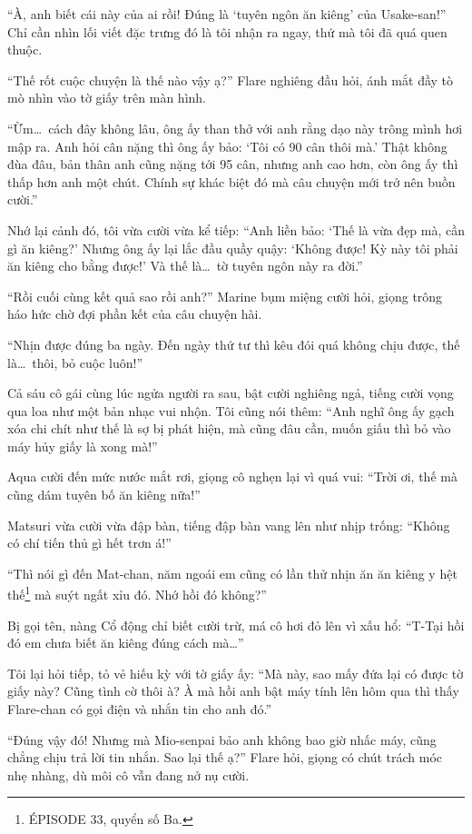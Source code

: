 \documentclass[../main.tex]{subfiles}
\begin{document}
``À, anh biết cái này của ai rồi! Đúng là `tuyên ngôn ăn kiêng' của Usake-san!'' Chỉ cần nhìn lối viết đặc trưng đó là tôi nhận ra ngay, thứ mà tôi đã quá quen thuộc.

``Thế rốt cuộc chuyện là thế nào vậy ạ?'' Flare nghiêng đầu hỏi, ánh mắt đầy tò mò nhìn vào tờ giấy trên màn hình.

``Ừm\dots\ cách đây không lâu, ông ấy than thở với anh rằng dạo này trông mình hơi mập ra. Anh hỏi cân nặng thì ông ấy bảo: `Tôi có 90 cân thôi mà.' Thật không đùa đâu, bản thân anh cũng nặng tới 95 cân, nhưng anh cao hơn, còn ông ấy thì thấp hơn anh một chút. Chính sự khác biệt đó mà câu chuyện mới trở nên buồn cười.''

Nhớ lại cảnh đó, tôi vừa cười vừa kể tiếp: ``Anh liền bảo: `Thế là vừa đẹp mà, cần gì ăn kiêng?' Nhưng ông ấy lại lắc đầu quầy quậy: `Không được! Kỳ này tôi phải ăn kiêng cho bằng được!' Và thế là\dots\ tờ tuyên ngôn này ra đời.''

``Rồi cuối cùng kết quả sao rồi anh?'' Marine bụm miệng cười hỏi, giọng trông háo hức chờ đợi phần kết của câu chuyện hài.

``Nhịn được đúng ba ngày. Đến ngày thứ tư thì kêu đói quá không chịu được, thế là\dots\ thôi, bỏ cuộc luôn!''

Cả sáu cô gái cùng lúc ngửa người ra sau, bật cười nghiêng ngả, tiếng cười vọng qua loa như một bản nhạc vui nhộn. Tôi cũng nói thêm: ``Anh nghĩ ông ấy gạch xóa chi chít như thế là sợ bị phát hiện, mà cũng đâu cần, muốn giấu thì bỏ vào máy hủy giấy là xong mà!''

Aqua cười đến mức nước mắt rơi, giọng cô nghẹn lại vì quá vui: ``Trời ơi, thế mà cũng dám tuyên bố ăn kiêng nữa!''

Matsuri vừa cười vừa đập bàn, tiếng đập bàn vang lên như nhịp trống: ``Không có chí tiến thủ gì hết trơn á!''

``Thì nói gì đến Mat-chan, năm ngoái em cũng có lần thử nhịn ăn ăn kiêng y hệt thế\footnote{{\flaregothic ÉPISODE 33}, quyển số Ba.} mà suýt ngất xỉu đó. Nhớ hồi đó không?''

Bị gọi tên, nàng Cổ động chỉ biết cười trừ, má cô hơi đỏ lên vì xấu hổ: ``T-Tại hồi đó em chưa biết ăn kiêng đúng cách mà\dots''

Tôi lại hỏi tiếp, tỏ vẻ hiếu kỳ với tờ giấy ấy: ``Mà này, sao mấy đứa lại có được tờ giấy này? Cũng tình cờ thôi à? À mà hồi anh bật máy tính lên hôm qua thì thấy Flare-chan có gọi điện và nhắn tin cho anh đó.''

``Đúng vậy đó! Nhưng mà Mio-senpai bảo anh không bao giờ nhấc máy, cũng chẳng chịu trả lời tin nhắn. Sao lại thế ạ?'' Flare hỏi, giọng có chút trách móc nhẹ nhàng, dù môi cô vẫn đang nở nụ cười.
\end{document}
